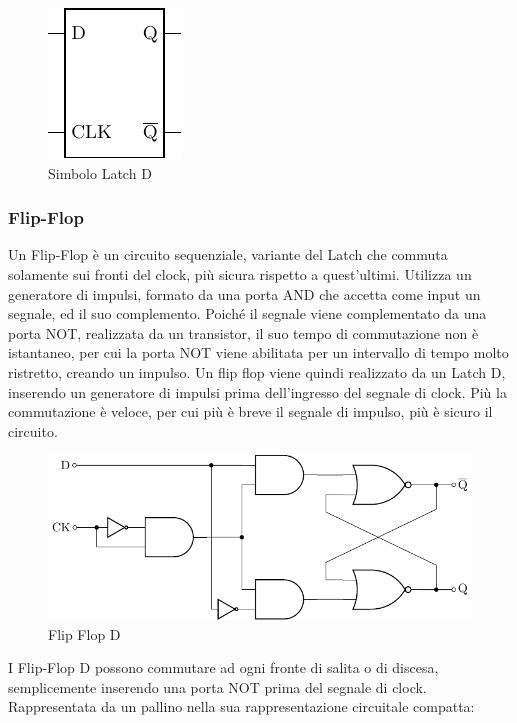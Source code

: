 \documentclass{article}
\numberwithin{equation}{subsection}
\begin{document}
\begin{figure}[H]%
    \centering%
    \includegraphics{latch-compatti.pdf}%
    \caption{Simbolo Latch D}%
\end{figure}


\subsubsection{Flip-Flop}

Un Flip-Flop è un circuito sequenziale, variante del Latch che commuta solamente sui fronti del clock, più sicura rispetto a quest'ultimi. Utilizza un generatore di impulsi, formato da una porta AND che accetta come 
input un segnale, ed il suo complemento. Poiché il segnale viene complementato da una porta NOT, realizzata da un transistor, il suo tempo di commutazione non è istantaneo, per cui la porta NOT viene abilitata per 
un intervallo di tempo molto ristretto, creando un impulso. 
Un flip flop viene quindi realizzato da un Latch D, inserendo un generatore di impulsi prima dell'ingresso del segnale di clock. Più la commutazione è veloce, per cui più è breve il segnale di impulso, più è sicuro 
il circuito. 

\begin{figure}[H]%
    \centering%
    \includegraphics{flip-flop-d.pdf}%
    \caption{Flip Flop D}%
\end{figure}

I Flip-Flop D possono commutare ad ogni fronte di salita o di discesa, semplicemente inserendo una porta NOT prima del segnale di clock. Rappresentata da un pallino nella sua rappresentazione circuitale compatta: 
\end{document}
